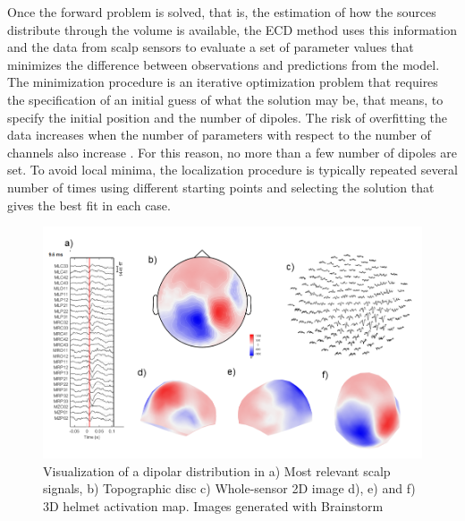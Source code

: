 Once the forward problem is solved, that is, the estimation of how the sources distribute through the volume is available, the ECD method uses this information and the data from scalp sensors to evaluate a set of parameter values that minimizes the difference between observations and predictions from the model. The minimization procedure is an iterative optimization problem that requires the specification of an initial guess of what the solution may be, that means, to specify the initial position and the number of dipoles. The risk of overfitting the data increases when the number of parameters with respect to the number of channels also increase \citep{Heller2014}. For this reason, no more than a few number of dipoles are set. To avoid local minima, the localization procedure is typically repeated several number of times using different starting points and selecting the solution that gives the best fit in each case.  

\begin{figure}[ht]
\centering
\includegraphics[width=1\textwidth]{Images/dipoles.png}
\caption{Visualization of a dipolar distribution in a) Most relevant scalp signals, b) Topographic disc c) Whole-sensor 2D image d), e) and f) 3D helmet activation map. Images generated with Brainstorm \citep{Tadel2011}}
\label{fig:dipolar}
\end{figure}   


